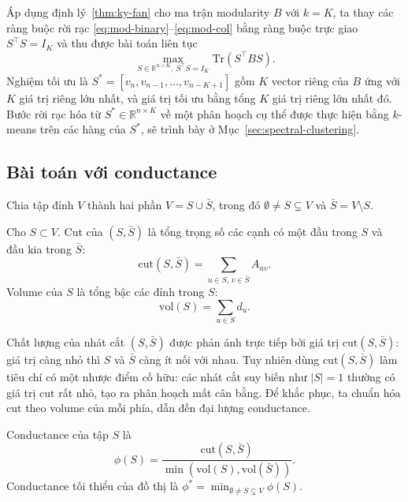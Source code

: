 Áp dụng định lý~\ref{thm:ky-fan} cho ma trận modularity $B$ với $k = K$, ta thay các ràng buộc rời rạc \eqref{eq:mod-binary}--\eqref{eq:mod-col} bằng ràng buộc trực giao $S^\top S = I_K$ và thu được bài toán liên tục
\begin{equation}
\label{eq:modularity-relaxed}
    \max_{S \in \mathbb{R}^{n \times K},\ S^\top S = I_K} \mathrm{Tr}(S^\top B S).
\end{equation}
Nghiệm tối ưu là $S^* = [v_n, v_{n-1}, \ldots, v_{n-K+1}]$ gồm $K$ vector riêng của $B$ ứng với $K$ giá trị riêng lớn nhất, và giá trị tối ưu bằng tổng $K$ giá trị riêng lớn nhất đó. Bước rời rạc hóa từ $S^* \in \mathbb{R}^{n \times K}$ về một phân hoạch cụ thể được thực hiện bằng $k$-means trên các hàng của $S^*$, sẽ trình bày ở Mục~\ref{sec:spectral-clustering}.

\subsection{Bài toán với conductance}
\label{subsec:problem-conductance}

Chia tập đỉnh $V$ thành hai phần $V = S \cup \bar{S}$, trong đó $\emptyset \neq S \subsetneq V$ và $\bar{S} = V \setminus S$.

\begin{definition}
\label{def:cut-volume}
Cho $S \subset V$. Cut của $(S, \bar{S})$ là tổng trọng số các cạnh có một đầu trong $S$ và đầu kia trong $\bar{S}$:
\[
    \mathrm{cut}(S, \bar{S}) = \sum_{u \in S,\, v \in \bar{S}} A_{uv}.
\]
Volume của $S$ là tổng bậc các đỉnh trong $S$:
\[
    \mathrm{vol}(S) = \sum_{u \in S} d_u.
\]
\end{definition}

Chất lượng của nhát cắt $(S, \bar{S})$ được phản ánh trực tiếp bởi giá trị $\mathrm{cut}(S, \bar{S})$: giá trị càng nhỏ thì $S$ và $\bar{S}$ càng ít nối với nhau. Tuy nhiên dùng $\mathrm{cut}(S, \bar{S})$ làm tiêu chí có một nhược điểm cố hữu: các nhát cắt suy biến như $|S| = 1$ thường có giá trị $\mathrm{cut}$ rất nhỏ, tạo ra phân hoạch mất cân bằng. Để khắc phục, ta chuẩn hóa $\mathrm{cut}$ theo volume của mỗi phía, dẫn đến đại lượng conductance.

\begin{definition}
\label{def:conductance}
Conductance của tập $S$ là
\[
    \phi(S) = \frac{\mathrm{cut}(S, \bar{S})}{\min(\mathrm{vol}(S), \mathrm{vol}(\bar{S}))}.
\]
Conductance tối thiểu của đồ thị là $\phi^* = \min_{\emptyset \neq S \subsetneq V} \phi(S)$.
\end{definition}

